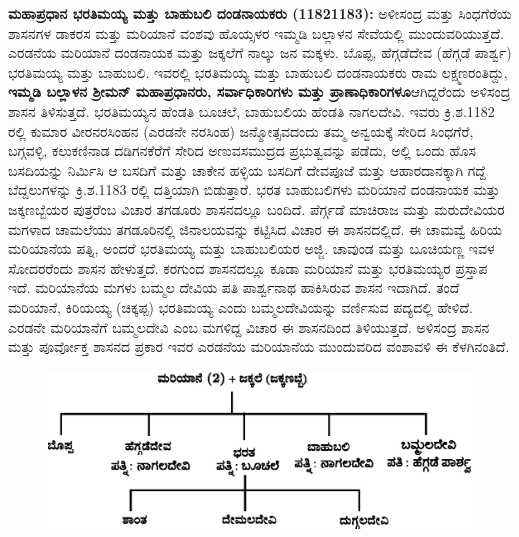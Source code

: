 \textbf{ಮಹಾಪ್ರಧಾನ ಭರತಿಮಯ್ಯ ಮತ್ತು ಬಾಹುಬಲಿ ದಂಡನಾಯಕರು (1182\general{\enginline{-}}1183): }ಅಳೀಸಂದ್ರ ಮತ್ತು ಸಿಂಧಗೆರೆಯ ಶಾಸನಗಳ ಡಾಕರಸ ಮತ್ತು ಮರಿಯಾನೆ ವಂಶವು ಹೊಯ್ಸಳರ ಇಮ್ಮಡಿ ಬಲ್ಲಾಳನ ಸೇವೆಯಲ್ಲಿ ಮುಂದುವರಿ\-ಯುತ್ತದೆ. ಎರಡನೆಯ ಮರಿಯಾನೆ ದಂಡನಾಯಕ ಮತ್ತು ಜಕ್ಕಲೆಗೆ ನಾಲ್ಕು ಜನ ಮಕ್ಕಳು. ಬೊಪ್ಪ, ಹೆಗ್ಗಡೆದೇವ (ಹೆಗ್ಗಡೆ ಪಾರ್ಶ್ವ) ಭರತಿಮಯ್ಯ ಮತ್ತು ಬಾಹುಬಲಿ. ಇವರಲ್ಲಿ ಭರತಿಮಯ್ಯ ಮತ್ತು ಬಾಹುಬಲಿ ದಂಡನಾಯಕರು ರಾಮ ಲಕ್ಷ್ಮಣರಂತಿದ್ದು, \textbf{ಇಮ್ಮಡಿ ಬಲ್ಲಾಳನ ಶ‍್ರೀಮನ್​ ಮಹಾಪ್ರಧಾನರು, ಸರ್ವಾಧಿಕಾರಿಗಳು ಮತ್ತು ಪ್ರಾಣಾಧಿಕಾರಿಗಳೂ}ಆಗಿದ್ದರೆಂದು ಅಳಿಸಂದ್ರ ಶಾಸನ ತಿಳಿಸುತ್ತದೆ. ಭರತಿಮಯ್ಯನ ಹೆಂಡತಿ ಬೂಚಲೆ, ಬಾಹುಬಲಿಯ ಹೆಂಡತಿ ನಾಗಲದೇವಿ. ಇವರು ಕ್ರಿ.ಶ.1182 ರಲ್ಲಿ ಕುಮಾರ ವೀರನರಸಿಂಹನ (ಎರಡನೇ ನರಸಿಂಹ) ಜನ್ಮೋತ್ಸವದಂದು ತಮ್ಮ ಅನ್ವಯಕ್ಕೆ ಸೇರಿದ ಸಿಂಧಗೆರೆ, ಬಗ್ಗವಳ್ಳಿ, ಕಲುಕಣಿನಾಡ ದಡಿಗನಕೆರೆಗೆ ಸೇರಿದ ಅಣುವಸಮುದ್ರದ ಪ್ರಭುತ್ವವನ್ನು ಪಡೆದು, ಅಲ್ಲಿ ಒಂದು ಹೊಸ ಬಸದಿಯನ್ನು ನಿರ್ಮಿಸಿ ಆ ಬಸದಿಗೆ ಮತ್ತು ಚಾಕೇನ ಹಳ್ಳಿಯ ಬಸದಿಗೆ ದೇವಪೂಜೆ ಮತ್ತು ಆಹಾರದಾನಕ್ಕಾಗಿ ಗದ್ದೆ ಬೆದ್ದಲುಗಳನ್ನು ಕ್ರಿ.ಶ.1183 ರಲ್ಲಿ ದತ್ತಿಯಾಗಿ ಬಿಡುತ್ತಾರೆ. ಭರತ ಬಾಹುಬಲಿಗಳು ಮರಿಯಾನೆ ದಂಡನಾಯಕ ಮತ್ತು ಜಕ್ಕಣಬ್ಬೆಯರ ಪುತ್ರರೆಂಬ ವಿಚಾರ ತಗಡೂರು ಶಾಸನದಲ್ಲೂ ಬಂದಿದೆ. ಪೆರ್ಗ್ಗಡೆ ಮಾಚಿರಾಜ ಮತ್ತು ಮರುದೇವಿಯರ ಮಗಳಾದ ಚಾಮಲೆಯು ತಗಡೂರಿನಲ್ಲಿ ಜಿನಾಲಯವನ್ನು ಕಟ್ಟಿಸಿದ ವಿಚಾರ ಈ ಶಾಸನದಲ್ಲಿದೆ. ಈ ಚಾಮವ್ವೆ ಹಿರಿಯ ಮರಿಯಾನೆಯ ಪತ್ನಿ, ಅಂದರೆ ಭರತಿಮಯ್ಯ ಮತ್ತು ಬಾಹುಬಲಿಯರ ಅಜ್ಜಿ. ಚಾವುಂಡ ಮತ್ತು ಬೂಚಿಯಣ್ಣ ಇವಳ ಸೋದರರೆಂದು ಶಾಸನ ಹೇಳುತ್ತದೆ. ಕರಗುಂದ ಶಾಸನದಲ್ಲೂ ಕೂಡಾ ಮರಿಯಾನೆ ಮತ್ತು ಭರತಿಮಯ್ಯರ ಪ್ರಸ್ತಾಪ ಇದೆ. ಮರಿಯಾನೆಯ ಮಗಳು ಬಮ್ಮಲ ದೇವಿಯ ಪತಿ ಪಾರ್ಶ್ವನಾಥ ಹಾಕಿಸಿರುವ ಶಾಸನ ಇದಾಗಿದೆ. ತಂದೆ ಮರಿಯಾನೆ, ಕಿರಿಯಯ್ಯ (ಚಿಕ್ಕಪ್ಪ) ಭರತಿಮಯ್ಯ ಎಂದು ಬಮ್ಮಲದೇವಿಯನ್ನು ವರ್ಣಿಸುವ ಪದ್ಯದಲ್ಲಿ ಹೇಳಿದೆ. ಎರಡನೇ ಮರಿಯಾನೆಗೆ ಬಮ್ಮಲದೇವಿ ಎಂಬ ಮಗಳಿದ್ದ ವಿಚಾರ ಈ ಶಾಸನದಿಂದ ತಿಳಿಯುತ್ತದೆ. ಅಳಿಸಂದ್ರ ಶಾಸನ ಮತ್ತು ಪೂರ್ವೋಕ್ತ ಶಾಸನದ ಪ್ರಕಾರ ಇವರ ಎರಡನೆಯ ಮರಿಯಾನೆಯ ಮುಂದುವರಿದ ವಂಶಾವಳಿ ಈ ಕೆಳಗಿನಂತಿದೆ.

\begin{figure}[H]
\includegraphics[scale=1.15]{images/chap3/chap3fig14.jpeg}
\end{figure}

